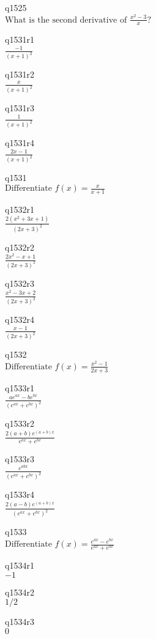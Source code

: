q1525\\
\(\displaystyle \text{What is the second derivative of } \frac{x^2 - 3}{x}? \)

q1531r1\\
\(\displaystyle \frac{-1}{(x+1)^2} \)

q1531r2\\
\(\displaystyle \frac{x}{(x+1)^2} \)

q1531r3\\
\(\displaystyle \frac{1}{(x+1)^2} \)

q1531r4\\
\(\displaystyle \frac{2x-1}{(x+1)^2} \)

q1531\\
\(\displaystyle \text{Differentiate } f(x) = \frac{x}{x+1} \)

q1532r1\\
\(\displaystyle \frac{2(x^2 + 3x + 1)}{(2x+3)^2} \)

q1532r2\\
\(\displaystyle \frac{2x^2 - x + 1}{(2x+3)^2} \)

q1532r3\\
\(\displaystyle \frac{x^2 - 3x + 2}{(2x+3)^2} \)

q1532r4\\
\(\displaystyle \frac{x-1}{(2x+3)^2} \)

q1532\\
\(\displaystyle \text{Differentiate } f(x) = \frac{x^2 - 1}{2x+3} \)

q1533r1\\
\(\displaystyle \frac{ae^{ax} - be^{bx}}{(e^{ax} + e^{bx})^2} \)

q1533r2\\
\(\displaystyle \frac{2(a+b)e^{(a+b)x}}{e^{ax} + e^{bx}} \)

q1533r3\\
\(\displaystyle \frac{e^{abx}}{(e^{ax} + e^{bx})^2} \)

q1533r4\\
\(\displaystyle \frac{2(a-b)e^{(a+b)x}}{(e^{ax} + e^{bx})^2} \)

q1533\\
\(\displaystyle \text{Differentiate } f(x) = \frac{e^{ax} - e^{bx}}{e^{ax} + e^{bx}} \)

q1534r1\\
\(\displaystyle -1 \)

q1534r2\\
\(\displaystyle 1/2 \)

q1534r3\\
\(\displaystyle 0 \)

